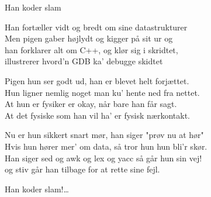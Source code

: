 \begin{song}{Han koder slam}
  \begin{SBVerse}
    Han fortæller vidt og bredt om sine datastrukturer\\
    Men pigen gaber højlydt og kigger på sit ur og\\
    han forklarer alt om C++, og klør sig i skridtet,\\
    illustrerer hvord'n GDB ka' debugge skidtet
  \end{SBVerse}

  \begin{SBVerse}
    Pigen hun ser godt ud, han er blevet helt forjættet.\\
    Hun ligner nemlig noget man ku' hente ned fra nettet.\\
    At hun er fysiker er okay, når bare han får sagt.\\
    At det fysiske som han vil ha' er fysisk nærkontakt.
  \end{SBVerse}

  \begin{SBVerse}
    Nu er hun sikkert snart mør, han siger "prøv nu at hør"\\
    Hvis hun hører mer' om data, så tror hun hun bli'r skør.\\
    Han siger sed og awk og lex og yacc så går hun sin vej!\\
    og stiv går han tilbage for at rette sine fejl.
  \end{SBVerse}

  \begin{SBChorus}
    Han koder slam!\ldots
  \end{SBChorus}
\end{song}